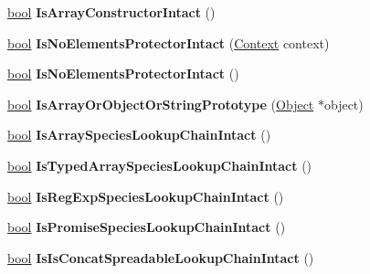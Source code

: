 \begin{DoxyCompactItemize}
\mbox{\hyperlink{classbool}{bool}} {\bfseries Is\+Array\+Constructor\+Intact} ()
\item 
\mbox{\label{classv8_1_1internal_1_1Isolate_a8b8836b73e21feaa7e92bc787ec15c90}} 
\mbox{\hyperlink{classbool}{bool}} {\bfseries Is\+No\+Elements\+Protector\+Intact} (\mbox{\hyperlink{classv8_1_1internal_1_1Context}{Context}} context)
\item 
\mbox{\label{classv8_1_1internal_1_1Isolate_a977a4f32c9dd5e53c11815e5508352ec}} 
\mbox{\hyperlink{classbool}{bool}} {\bfseries Is\+No\+Elements\+Protector\+Intact} ()
\item 
\mbox{\label{classv8_1_1internal_1_1Isolate_aef9979afb891fddddb673aba56d925e2}} 
\mbox{\hyperlink{classbool}{bool}} {\bfseries Is\+Array\+Or\+Object\+Or\+String\+Prototype} (\mbox{\hyperlink{classv8_1_1internal_1_1Object}{Object}} $\ast$object)
\item 
\mbox{\label{classv8_1_1internal_1_1Isolate_acafa84933535e7f054cac75191b6431e}} 
\mbox{\hyperlink{classbool}{bool}} {\bfseries Is\+Array\+Species\+Lookup\+Chain\+Intact} ()
\item 
\mbox{\label{classv8_1_1internal_1_1Isolate_aef5ae0c01e1a7b4fbec2c8f16ece4bee}} 
\mbox{\hyperlink{classbool}{bool}} {\bfseries Is\+Typed\+Array\+Species\+Lookup\+Chain\+Intact} ()
\item 
\mbox{\label{classv8_1_1internal_1_1Isolate_ac3309da1ce34afe9ca2f769de9b82619}} 
\mbox{\hyperlink{classbool}{bool}} {\bfseries Is\+Reg\+Exp\+Species\+Lookup\+Chain\+Intact} ()
\item 
\mbox{\label{classv8_1_1internal_1_1Isolate_a1c2714df579458b354c76d65a92c11c2}} 
\mbox{\hyperlink{classbool}{bool}} {\bfseries Is\+Promise\+Species\+Lookup\+Chain\+Intact} ()
\item 
\mbox{\label{classv8_1_1internal_1_1Isolate_ada0e966b3334a92d45803507b81db01f}} 
\mbox{\hyperlink{classbool}{bool}} {\bfseries Is\+Is\+Concat\+Spreadable\+Lookup\+Chain\+Intact} ()

\end{DoxyCompactItemize}
